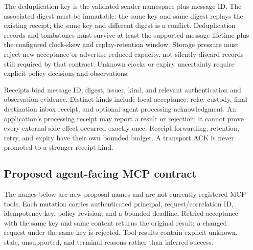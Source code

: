The deduplication key is the validated sender namespace plus message ID.
The associated digest must be immutable: the same key and same digest replays
the existing receipt; the same key and different digest is a conflict.
Deduplication records and tombstones must survive at least the supported
message lifetime plus the configured clock-skew and replay-retention window.
Storage pressure must reject new acceptance or advertise reduced capacity,
not silently discard records still required by that contract. Unknown clocks
or expiry uncertainty require explicit policy decisions and observations.

Receipts bind message ID, digest, issuer, kind, and relevant authentication
and observation evidence. Distinct kinds include local acceptance, relay
custody, final destination inbox receipt, and optional agent processing
acknowledgment. An application's processing receipt may report a result or
rejection; it cannot prove every external side effect occurred exactly once.
Receipt forwarding, retention, retry, and expiry have their own bounded
budget. A transport ACK is never promoted to a stronger receipt kind.


\subsection{Proposed agent-facing MCP contract}
The names below are new proposal names and are not currently registered MCP
tools. Each mutation carries authenticated principal, request/correlation ID,
idempotency key, policy revision, and a bounded deadline. Retried acceptance
with the same key and same content returns the original result; a changed
request under the same key is rejected. Tool results contain explicit unknown,
stale, unsupported, and terminal reasons rather than inferred success.

